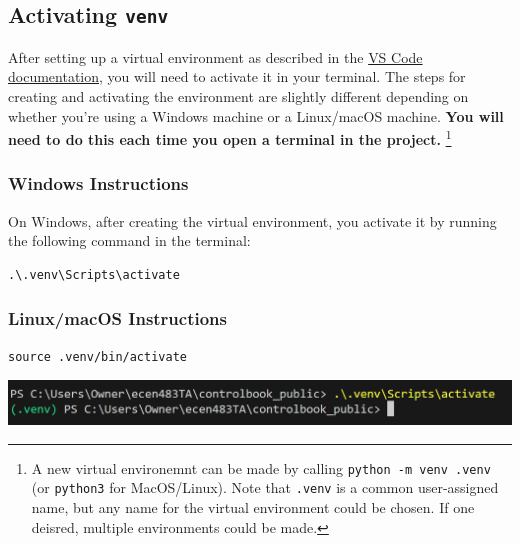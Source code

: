 \documentclass{article}
\begin{document}
\subsection{Activating \texttt{venv}}

After setting up a virtual environment as described in the \href{https://code.visualstudio.com/docs/python/environments#_creating-environments}{VS Code documentation}, you will need to activate it in your terminal. The steps for creating and activating the environment are slightly different depending on whether you're using a Windows machine or a Linux/macOS machine. \textbf{You will need to do this each time you open a terminal in the project.} \footnote{A new virtual environemnt can be made by calling \texttt{python -m venv .venv} (or \texttt{python3} for MacOS/Linux). Note that \texttt{.venv} is a common user-assigned name, but any name for the virtual environment could be chosen. If one deisred, multiple environments could be made.}

\subsubsection{Windows Instructions}
On Windows, after creating the virtual environment, you activate it by running the following command in the terminal:

\begin{verbatim}
.\.venv\Scripts\activate
\end{verbatim}

\subsubsection{Linux/macOS Instructions}

\begin{verbatim}
source .venv/bin/activate
\end{verbatim}

\begin{center}
    \includegraphics[width=\linewidth]{pic7g-venv.png} 
\end{center}
\end{document}
